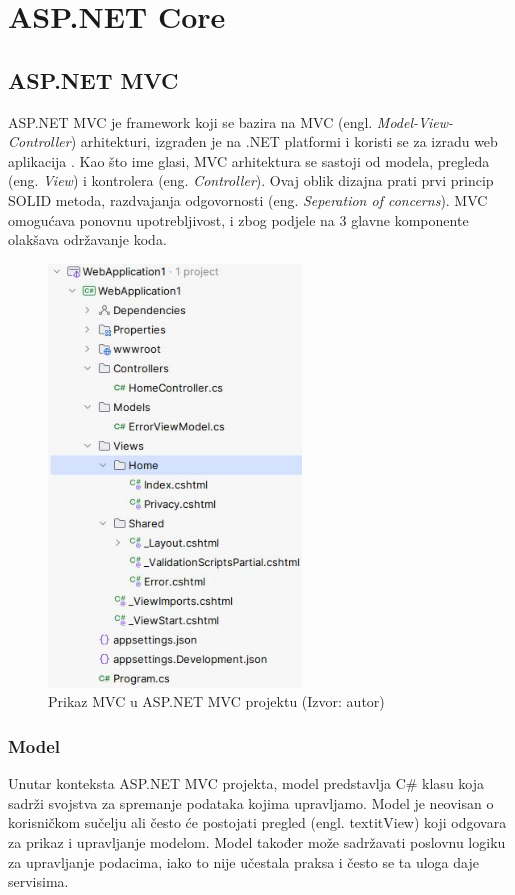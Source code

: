 \documentclass{foi}
\begin{document}
\chapter{ASP.NET Core}
\section{ASP.NET MVC}
ASP.NET MVC je framework koji se bazira na MVC (engl. \textit{Model-View-Controller}) arhitekturi, izgrađen je na .NET platformi i koristi se za izradu web aplikacija \cite{Tyler2024}.
Kao što ime glasi, MVC arhitektura se sastoji od modela, pregleda (eng. \textit{View}) i kontrolera (eng. \textit{Controller}). Ovaj oblik dizajna prati prvi princip SOLID metoda, razdvajanja odgovornosti (eng. \textit{Seperation of concerns}).
MVC omogućava ponovnu upotrebljivost, i zbog podjele na 3 glavne komponente olakšava održavanje koda. \cite{GeeksforGeeks2024}
\begin{figure}[H]
    \centering
    \includegraphics[width=0.6\textwidth]{slike/MVC_project.jpeg}
    \caption{Prikaz MVC u ASP.NET MVC projektu (Izvor: autor)}
    \label{fig:mvc_projekt}
\end{figure}

\subsection{Model}
Unutar konteksta ASP.NET MVC projekta, model predstavlja C\# klasu koja sadrži svojstva za spremanje podataka kojima upravljamo. Model je neovisan o korisničkom sučelju ali često će postojati pregled (engl. textit{View}) koji odgovara za prikaz i upravljanje modelom.
Model također može sadržavati poslovnu logiku za upravljanje podacima, iako to nije učestala praksa i često se ta uloga daje servisima.
\end{document}
